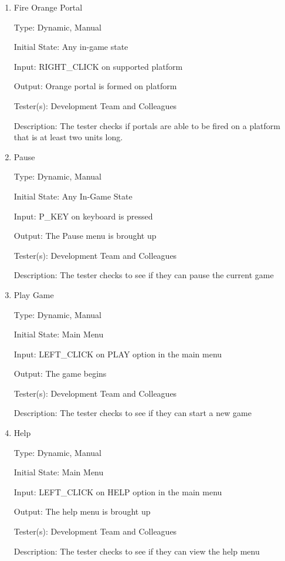 \documentclass[12pt, titlepage]{article}
\begin{document}
\begin{enumerate}
\item{Fire Orange Portal\\}

Type: Dynamic, Manual

Initial State: Any in-game state

Input: RIGHT\_CLICK on supported platform

Output: Orange portal is formed on platform

Tester(s): Development Team and Colleagues

Description: The tester checks if portals are able to be fired on a platform that is at least two units long.

\item{Pause\\}

Type: Dynamic, Manual

Initial State: Any In-Game State

Input: P\_KEY on keyboard is pressed

Output: The Pause menu is brought up

Tester(s): Development Team and Colleagues

Description: The tester checks to see if they can pause the current game

\item{Play Game\\}

Type: Dynamic, Manual

Initial State: Main Menu

Input: LEFT\_CLICK on PLAY option in the main menu

Output: The game begins

Tester(s): Development Team and Colleagues

Description: The tester checks to see if they can start a new game

\item{Help\\}

Type: Dynamic, Manual

Initial State: Main Menu

Input: LEFT\_CLICK on HELP option in the main menu

Output: The help menu is brought up

Tester(s): Development Team and Colleagues

Description: The tester checks to see if they can view the help menu

\end{enumerate}
\end{document}
